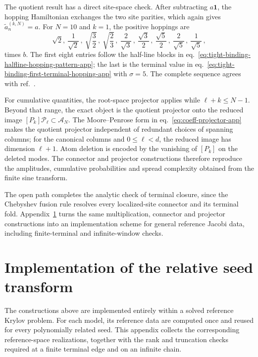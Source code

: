 \documentclass[a4paper,11pt]{article}
\theoremstyle{definition}
\theoremstyle{remark}
\newcommand{\cA}{\mathcal A}
\newcommand{\cP}{\mathcal P}
\newcommand{\Id}{\mathbf 1}
\begin{document}
The quotient result has a direct site-space check.  After subtracting
$a\Id$, the hopping Hamiltonian exchanges the two site parities, which
again gives $\widetilde a_n^{(k,N)}=a$.  For $N=10$ and $k=1$, the
positive hoppings are
\begin{equation}
   \sqrt2,\ \frac1{\sqrt2}\,,\ \sqrt{\frac32}\,,\
   \sqrt{\frac23}\,,\ \frac2{\sqrt3}\,,\ \frac{\sqrt3}{2}\,,\
   \frac{\sqrt5}{2}\,,\ \frac2{\sqrt5}\,,\ \frac1{\sqrt5}\,,
\end{equation}
times $b$.  The first eight entries follow the half-line blocks in
eq.~\eqref{eq:tight-binding-halfline-hopping-pattern-app}; the last is
the terminal value in
eq.~\eqref{eq:tight-binding-first-terminal-hopping-app} with
$\sigma=5$.  The complete sequence agrees with
ref.~\cite{Balasubramanian:2025variations}.

For cumulative quantities, the root-space projector applies while
$\ell+k\le N-1$.  Beyond that range, the exact object is the quotient
projector onto the reduced image
$[P_k]\cP_\ell\subset\cA_N$. The Moore--Penrose form in
eq.~\eqref{eq:coeff-projector-app} makes the quotient projector
independent of redundant choices of spanning columns; for the canonical
columns and $0\le\ell<d$, the reduced image has dimension $\ell+1$.
Atom deletion is encoded by the vanishing of $[P_k]$ on the deleted
modes. The connector and
projector constructions therefore reproduce the amplitudes, cumulative
probabilities and spread complexity obtained from the finite sine
transform.

The open path completes the analytic check of terminal closure, since the
Chebyshev fusion rule resolves every localized-site connector and its
terminal fold.  Appendix~\ref{app:numerics} turns the same
multiplication, connector and projector constructions into an
implementation scheme for %
general reference Jacobi data, including finite-terminal and infinite-window checks.

\section{Implementation of the relative seed transform}
\label{app:numerics}

The constructions above are implemented entirely within a solved
reference Krylov problem. For each model, its reference data are
computed once and reused for every polynomially related seed. This
appendix collects the corresponding reference-space realizations, together with
the rank and truncation checks required at a finite terminal edge and
on an infinite chain.
\end{document}
